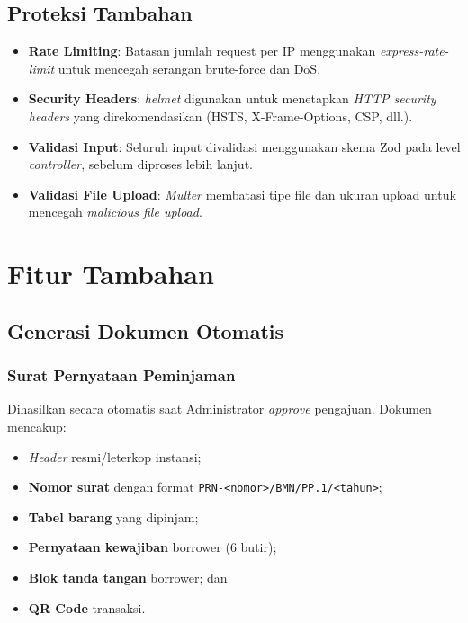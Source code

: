 \documentclass[
  12pt,
  a4paper,
  oneside,
  final
]{report}
\begin{document}
\section{Proteksi Tambahan}

\begin{itemize}
  \item {\bfseries Rate Limiting}: Batasan jumlah request per IP
        menggunakan {\it express-rate-limit} untuk mencegah
        serangan brute-force dan DoS.
  \item {\bfseries Security Headers}: {\it helmet} digunakan
        untuk menetapkan {\it HTTP security headers} yang
        direkomendasikan (HSTS, X-Frame-Options, CSP, dll.).
  \item {\bfseries Validasi Input}: Seluruh input divalidasi
        menggunakan skema Zod pada level {\it controller},
        sebelum diproses lebih lanjut.
  \item {\bfseries Validasi File Upload}: {\it Multer}
        membatasi tipe file dan ukuran upload untuk mencegah
        {\it malicious file upload}.
\end{itemize}

\chapter{Fitur Tambahan}


\section{Generasi Dokumen Otomatis}

\subsection{Surat Pernyataan Peminjaman}
Dihasilkan secara otomatis saat Administrator {\it approve}
pengajuan. Dokumen mencakup:
\begin{itemize}
  \item {\it Header} resmi/leterkop instansi;
  \item {\bfseries Nomor surat} dengan format
        \texttt{PRN-<nomor>/BMN/PP.1/<tahun>};
  \item {\bfseries Tabel barang} yang dipinjam;
  \item {\bfseries Pernyataan kewajiban} borrower (6 butir);
  \item {\bfseries Blok tanda tangan} borrower; dan
  \item {\bfseries QR Code} transaksi.
\end{itemize}
\end{document}
